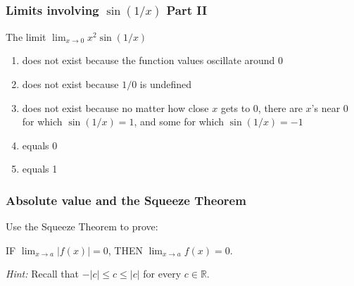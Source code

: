 \documentclass[14pt]{beamer}
\begin{document}

	\begin{frame}
		\frametitle{Limits involving $\displaystyle \sin(1/x)$ Part II}

		\begin{block}{The limit $\displaystyle{\lim_{x\rightarrow 0}x^2\sin (1/x)}$ }
			\begin{enumerate}
				\item does not exist because the function values oscillate around $0$

				\item does not exist because $1/0$ is undefined

				\item does not exist because no matter how close $x$ gets to $0$, there
					are $x$'s near $0$ for which $\sin(1/x) =1$, and some for which $\sin (
					1/x)=-1$

				\item equals 0

				\item equals 1
			\end{enumerate}
		\end{block}
	\end{frame}


	\begin{frame}
		\frametitle{Absolute value and the Squeeze Theorem}

		Use the Squeeze Theorem to prove:
		\begin{theorem}
			IF $\displaystyle \lim_{x\to a}|f(x)| = 0$, THEN
			$\displaystyle \lim_{x\to a}f(x)=0$.\\
		\end{theorem}

		\emph{Hint:} Recall that $-|c| \leq c \leq |c|$ for every $c \in \mathbb{R}$.
	\end{frame}

\end{document}
